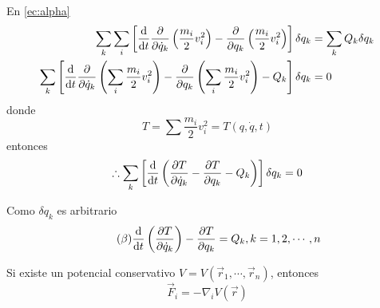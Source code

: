 \documentclass[../main]{subfiles}
\begin{document}
En \eqref{ec:alpha}
\begin{equation}
    \begin{split}
        \sum_k \sum_i \left[\dv{}{t}\pdv{}{\dot{q}_k}\left(\dfrac{m_i}{2}v^2_i\right)-\pdv{}{q_k}\left(\dfrac{m_i}{2}v^2_i\right)\right]\delta q_k &=\sum_k Q_k \delta q_k \\
        \sum_k\left[\dv{}{t}\pdv{}{\dot{q}_k}\left(\sum_i \dfrac{m_i}{2}v^2_i\right)-\pdv{}{q_k}\left(\sum_i \dfrac{m_i}{2}v^2_i\right)-Q_k\right]\delta q_k&=0
    \end{split}
\end{equation}
donde
\begin{equation}
    T=\sum \dfrac{m_i}{2}v_i^2=T(q, \dot{q}, t)
\end{equation}
entonces
\begin{equation}
    \therefore \sum_k \left[\dv{}{t}\left(\pdv{T}{\dot{q}_k}-\pdv{T}{q_k}-Q_k\right)\right]\delta q_k=0
\end{equation}

Como $\delta q_k$ es arbitrario
\begin{equation}\tag{$\beta$}
    \dv{}{t}\left(\pdv{T}{\dot{q}_k}\right)-\pdv{T}{q_k}=Q_k, k=1,2,\cdots, n
    \label{ec:beta}
\end{equation}

Si existe un potencial conservativo $V=V(\vec{r}_1, \cdots, \vec{r}_n)$, entonces
\begin{equation}
    \vec{F}_i=-\nabla_i V(\vec{r})
\end{equation}
\end{document}

